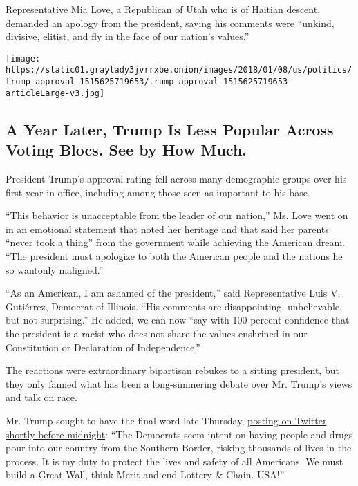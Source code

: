 Representative Mia Love, a Republican of Utah who is of Haitian descent,
demanded an apology from the president, saying his comments were
``unkind, divisive, elitist, and fly in the face of our nation's
values.''

\href{https://www.nytimes3xbfgragh.onion/interactive/2018/01/11/us/politics/trump-approval.html}{}

\texttt{[image: https://static01.graylady3jvrrxbe.onion/images/2018/01/08/us/politics/trump-approval-1515625719653/trump-approval-1515625719653-articleLarge-v3.jpg]}

\hypertarget{a-year-later-trump-is-less-popular-across-voting-blocs-see-by-how-much}{%
\subsection{A Year Later, Trump Is Less Popular Across Voting Blocs. See
by How
Much.}\label{a-year-later-trump-is-less-popular-across-voting-blocs-see-by-how-much}}

President Trump's approval rating fell across many demographic groups
over his first year in office, including among those seen as important
to his base.

``This behavior is unacceptable from the leader of our nation,'' Ms.
Love went on in an emotional statement that noted her heritage and that
said her parents ``never took a thing'' from the government while
achieving the American dream. ``The president must apologize to both the
American people and the nations he so wantonly maligned.''

``As an American, I am ashamed of the president,'' said Representative
Luis V. Gutiérrez, Democrat of Illinois. ``His comments are
disappointing, unbelievable, but not surprising.'' He added, we can now
``say with 100 percent confidence that the president is a racist who
does not share the values enshrined in our Constitution or Declaration
of Independence.''

The reactions were extraordinary bipartisan rebukes to a sitting
president, but they only fanned what has been a long-simmering debate
over Mr. Trump's views and talk on race.

Mr. Trump sought to have the final word late Thursday,
\href{https://twitter.com/realDonaldTrump/status/951675713089888256}{posting
on Twitter shortly before midnight}: ``The Democrats seem intent on
having people and drugs pour into our country from the Southern Border,
risking thousands of lives in the process. It is my duty to protect the
lives and safety of all Americans. We must build a Great Wall, think
Merit and end Lottery \& Chain. USA!''

